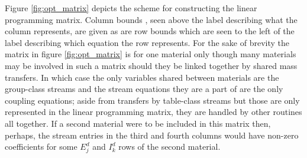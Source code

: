 Figure \ref{fig:opt_matrix}
depicts the scheme for constructing the linear programming matrix. Column bounds
, seen above the label describing what the column represents, are given as
are row bounds which are seen to the left of the label describing which equation
the row represents. For the sake of brevity
the matrix in figure \ref{fig:opt_matrix} is for one material only though many
materials may be involved in such a matrix should they be linked together
by shared mass transfers. In which case the only variables shared between materials are the
group-class streams and the stream equations they are a part of are the only
coupling equations; aside from transfers by table-class streams but those
are only represented in the linear programming matrix, they are handled by
other routines all together. If a second material were to be included in this
matrix then, perhaps, the stream entries in the third and fourth columns would
have non-zero coefficients for some $E_{j}^{d}$ and $I_{k}^{d}$ rows of the 
second material.

